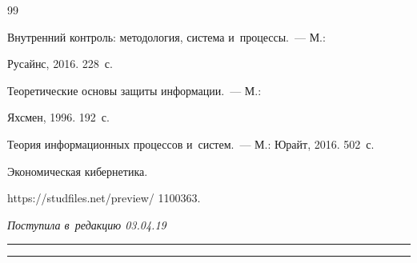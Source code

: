 {{\begin{thebibliography}{99}


 Внутренний контроль: методология, система и~процессы.~--- М.: 


Русайнс, 2016. 228~с.




 Теоретические основы защиты информации.~--- М.: 


Яхсмен, 1996. 192~с.




 Теория информационных процессов и~систем.~--- М.: Юрайт, 2016. 502~с. 




 Экономическая кибернетика. 


{\sf https://studfiles.net/preview/ 1100363}.





 \end{thebibliography}


} }





\vspace*{-6pt}





\hfill{\small\textit{Поступила в~редакцию 03.04.19}}





\vspace*{8pt}





\hrule





\vspace*{2pt}















\hrule





\vspace*{8pt}





